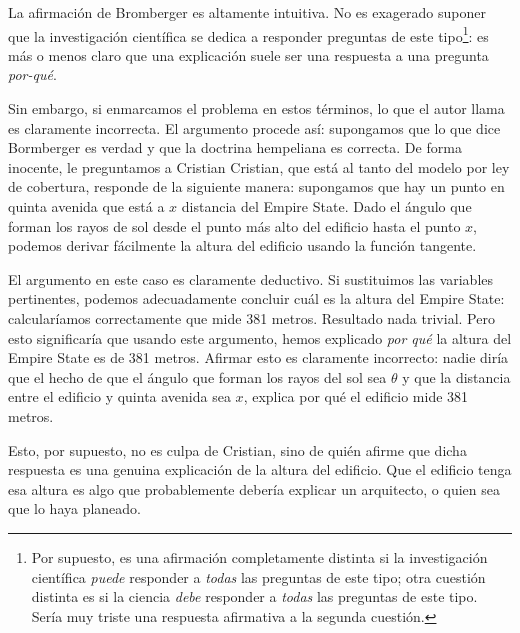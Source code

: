 La afirmación de Bromberger es altamente intuitiva. No es exagerado
suponer que la investigación científica se dedica a responder
preguntas de este tipo\footnote{
	Por supuesto, es una afirmación	completamente distinta si la
	investigación científica \emph{puede} responder a \emph{todas} las
	preguntas de este tipo; otra cuestión	distinta es si la ciencia \emph
	{debe} responder a \emph{todas} las	preguntas de este tipo. Sería muy
	triste una respuesta afirmativa a	la segunda cuestión.
}: es más o menos claro que una explicación suele ser una respuesta a una
pregunta \emph{por-qué}.

Sin embargo, si enmarcamos el problema en estos términos, lo que el
autor llama  es claramente incorrecta.
El argumento procede así: supongamos que lo que dice Bormberger es verdad
y que la doctrina hempeliana es correcta. De forma inocente, le
preguntamos a Cristian  Cristian, que está al tanto del modelo por ley de cobertura,
responde de la siguiente manera: supongamos que hay un punto en quinta
avenida que está a $x$ distancia del Empire State. Dado el ángulo que
forman los rayos de sol desde el punto más alto del edificio hasta el punto
$x$, podemos derivar fácilmente la altura del edificio usando la
función tangente.

El argumento en este caso es claramente deductivo. Si sustituimos las
variables pertinentes, podemos adecuadamente concluir cuál es la
altura del Empire State: calcularíamos correctamente que mide 381 metros.
Resultado nada trivial. Pero esto significaría que usando este argumento,
hemos explicado \emph{por qué} la altura del Empire State es de 381 metros.
Afirmar esto es claramente incorrecto: nadie diría que el hecho de
que el ángulo que forman los rayos del sol sea $\theta$ y que la
distancia entre el edificio y quinta avenida sea $x$, explica por qué
el edificio mide 381 metros.

Esto, por supuesto, no es culpa de Cristian, sino de quién afirme que
dicha respuesta es una genuina explicación de la altura del edificio.
Que el edificio tenga esa altura es algo que probablemente debería
explicar un arquitecto, o quien sea que lo haya planeado.

